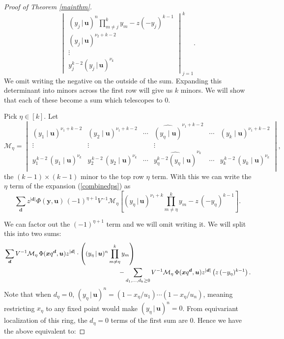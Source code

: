\documentclass[12pt]{article}
\theoremstyle{plain}
\theoremstyle{definition}
\newcommand{\xb}{\boldsymbol{x}}
\newcommand{\db}{\boldsymbol{d}}
\newcommand{\ub}{\boldsymbol{u}}
\begin{document}
\begin{proof}[Proof of Theorem \ref{mainthm}]
\begin{equation}
\begin{vmatrix}
    (y_j \, | \, \ub)^n \prod\limits_ {{m}\neq j}^k y_{m} - z (-y_j)^{k-1}\\
    (y_j \, | \, \ub)^{\nu_2+k-2}\\
    \vdots\\
    y_j ^{k-2} (y_j \, | \, \ub)^{\nu_k}
\end{vmatrix}_{j=1} ^k.
\end{equation}
We omit writing the negative on the outside of the sum. Expanding this determinant into minors across the first row will give us $k$ minors. We will show that each of these become a sum which telescopes to 0.
\vspace{0.4cm}

\noindent
Pick $\eta\in [k]$. Let
\begin{equation}
    \mathcal{M}_\eta = \begin{vmatrix}
(y_1\!\mid\!\ub)^{\nu_1 + k - 2} & (y_2\!\mid\!\ub)^{\nu_1 + k - 2} & \cdots &\widehat{ (y_\eta\!\mid\!\ub)}^{\nu_1 + k - 2}&\cdots&(y_k\!\mid\!\ub)^{\nu_1 + k - 2} \\
\vdots & \vdots & & \vdots \\
y_1^{\,k-2}\,(y_1\!\mid\!\ub)^{\nu_k} & y_2^{\,k-2}\,(y_2\!\mid\!\ub)^{\nu_k} & \cdots &\widehat{y_\eta ^{k-2} (y_\eta\!\mid\!\ub)}^{\nu_k}&\cdots& y_k^{\,k-2}\,(y_k\!\mid\!\ub)^{\nu_k} \\
\end{vmatrix},
\end{equation}
the $(k-1)\times (k-1)$ minor to the top row $\eta$ term. With this we can write the $\eta$ term of the expansion (\ref{combinedps}) as 
\begin{equation} \label{VMsum} 
\sum_{\boldsymbol{d}} z^{|\db|}\Phi(\boldsymbol{y},\ub) \,(-1)^{\eta+1}V^{-1} \mathcal{M}_\eta \left[  (y_\eta \, | \, \ub)^{\nu_1+k} \prod _{m\neq \eta} ^k y_m - z\, (-y_\eta) ^{k-1}\right].
\end{equation}

We can factor out the $(-1)^{\eta+1}$ term and we will omit writing it. We will split this into two sums:
\begin{align*}
    &\sum_{\boldsymbol{d}}  V ^{-1}\mathcal{M}_\eta \, \Phi(\xb q^{\boldsymbol{d}},\ub){z}^{|\boldsymbol{d}|}  \cdot \left(  (y_\eta \, | \, \ub)^{n} \prod _{m\neq \eta} ^k y_m\right) \\&\hspace{2.5in}
- \sum_{d_1,\dots,d_k \geq 0} V ^{-1}\mathcal{M}_\eta \, \Phi(\xb q^{\boldsymbol{d}},\ub){z}^{|\boldsymbol{d}|}\left(z\, (-y_\eta )^{k-1}\right).
\end{align*}
Note that when $d_\eta=0$, $(y_\eta \, | \, \ub)^{n} =(1-x_\eta /u_1)\cdots (1-x_\eta /u_n)$, meaning restricting $x_\eta$ to any fixed point would make $(y_\eta \, | \, \ub)^n=0$. From equivariant localization of this ring, the $d_\eta=0$ terms of the first sum are 0. Hence we have the above equivalent to:


\end{proof}
\end{document}
